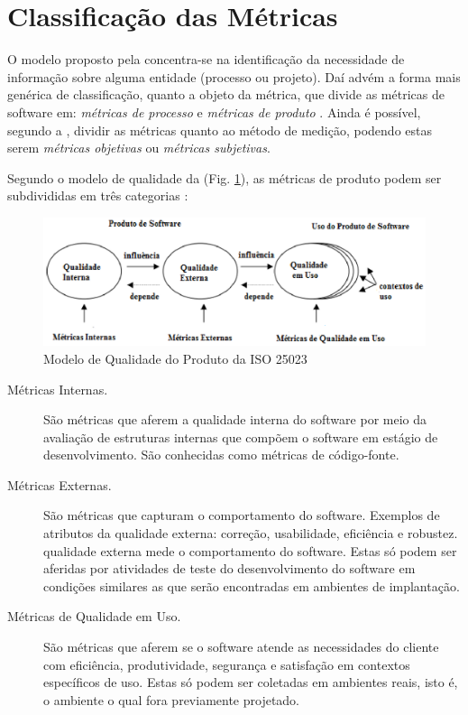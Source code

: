 \section{Classificação das Métricas}	
\label {Classificação das Métricas}
O modelo proposto pela  concentra-se na identificação da 
necessidade de informação sobre alguma entidade (processo ou projeto). Daí advém
a forma mais genérica de classificação, quanto a objeto da métrica, que divide 
as métricas de software em: \textit{métricas de processo} e 
\textit{métricas de produto} \cite{Mills:1999}. Ainda é possível, segundo a 
, dividir as métricas quanto ao método de medição, podendo
estas serem \textit{métricas objetivas} ou \textit{métricas subjetivas}.


Segundo o modelo de qualidade da  
(Fig. \ref{modelodequalidade}), as métricas de produto podem ser subdivididas 
em três categorias :
				
\begin{figure}[h]
\centering
\includegraphics[keepaspectratio=false,scale=1.0]{figuras/modelodequalidade.eps}
\caption{Modelo de Qualidade do Produto da ISO 25023}
\label{modelodequalidade}
\end{figure}
			
\begin{description}
		\item[Métricas Internas.] 
		São métricas que aferem a qualidade interna do software por meio da 
		avaliação de estruturas internas que compõem o software em estágio de 
		desenvolvimento. São conhecidas como métricas de código-fonte.

		\item[Métricas Externas.]
		São métricas que capturam o comportamento do software. Exemplos de 
		atributos da qualidade externa: correção, usabilidade, eficiência e 
		robustez. qualidade externa mede  o comportamento do software. Estas só 
		podem ser aferidas por atividades de teste do desenvolvimento do 
		software em condições similares as que serão encontradas em ambientes de
		implantação.

		\item[Métricas de Qualidade em Uso.]
		 São métricas que aferem se o software atende as necessidades do cliente
		 com eficiência, produtividade, segurança e satisfação em contextos 
		 específicos de uso. Estas só podem ser coletadas em ambientes reais, 
		 isto é, o ambiente o qual fora previamente projetado.
			 
\end{description}
		

